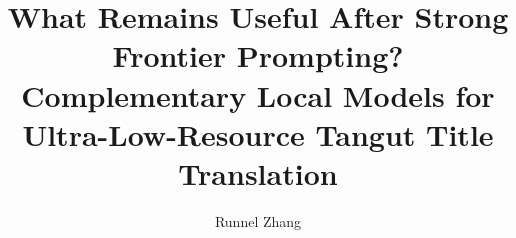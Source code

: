 \documentclass[11pt]{article}
\title{What Remains Useful After Strong Frontier Prompting? Complementary Local Models for Ultra-Low-Resource Tangut Title Translation}
\author{Runnel Zhang}
\date{}
\begin{document}
\maketitle

\begin{abstract}

\end{abstract}









\end{document}
